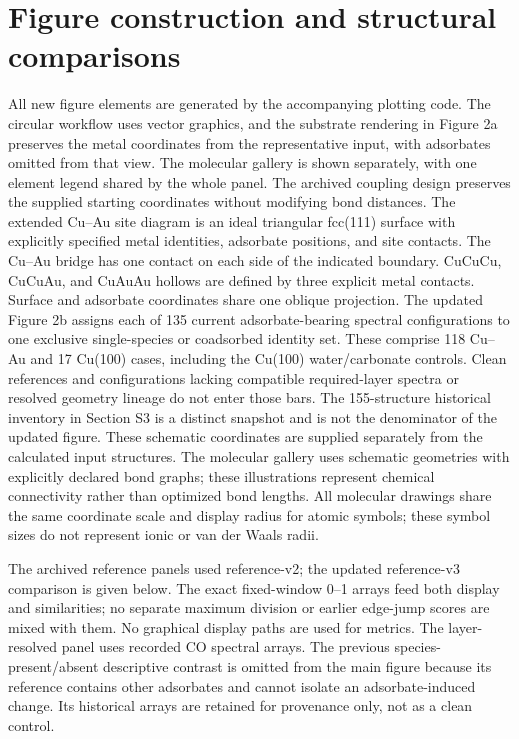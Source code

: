 \documentclass[11pt,a4paper]{article}
\begin{document}
\section{Figure construction and structural comparisons}
All new figure elements are generated by the accompanying plotting code. The circular workflow uses vector graphics, and the substrate rendering in Figure 2a preserves the metal coordinates from the representative input, with adsorbates omitted from that view. The molecular gallery is shown separately, with one element legend shared by the whole panel. The archived coupling design preserves the supplied starting coordinates without modifying bond distances. The extended Cu--Au site diagram is an ideal triangular fcc(111) surface with explicitly specified metal identities, adsorbate positions, and site contacts. The Cu--Au bridge has one contact on each side of the indicated boundary. CuCuCu, CuCuAu, and CuAuAu hollows are defined by three explicit metal contacts. Surface and adsorbate coordinates share one oblique projection. The updated Figure 2b assigns each of 135 current adsorbate-bearing spectral configurations to one exclusive single-species or coadsorbed identity set. These comprise 118 Cu--Au and 17 Cu(100) cases, including the Cu(100) water/carbonate controls. Clean references and configurations lacking compatible required-layer spectra or resolved geometry lineage do not enter those bars. The 155-structure historical inventory in Section S3 is a distinct snapshot and is not the denominator of the updated figure. These schematic coordinates are supplied separately from the calculated input structures. The molecular gallery uses schematic geometries with explicitly declared bond graphs; these illustrations represent chemical connectivity rather than optimized bond lengths. All molecular drawings share the same coordinate scale and display radius for atomic symbols; these symbol sizes do not represent ionic or van der Waals radii.

The archived reference panels used reference-v2; the updated reference-v3 comparison is given below. The exact fixed-window 0--1 arrays feed both display and similarities; no separate maximum division or earlier edge-jump scores are mixed with them. No graphical display paths are used for metrics. The layer-resolved panel uses recorded CO spectral arrays. The previous species-present/absent descriptive contrast is omitted from the main figure because its reference contains other adsorbates and cannot isolate an adsorbate-induced change. Its historical arrays are retained for provenance only, not as a clean control.
\end{document}
